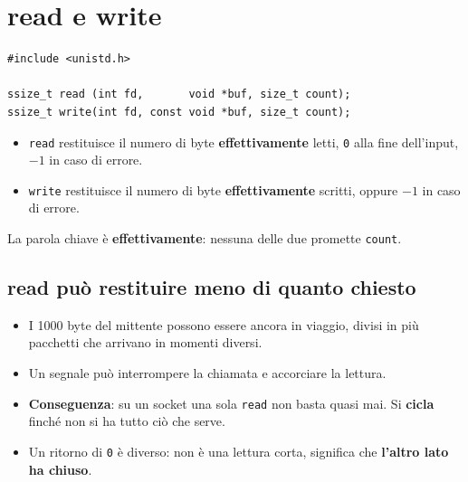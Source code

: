 \section{read e write}

\begin{lstlisting}[language={[POSIX]C}]
#include <unistd.h>

ssize_t read (int fd,       void *buf, size_t count);
ssize_t write(int fd, const void *buf, size_t count);
\end{lstlisting}

\begin{itemize}
    \item \texttt{read} restituisce il numero di byte \textbf{effettivamente} letti, \texttt{0} alla fine dell'input,
          $-1$ in caso di errore.
    \item \texttt{write} restituisce il numero di byte \textbf{effettivamente} scritti, oppure $-1$ in caso di errore.
\end{itemize}

La parola chiave è \textbf{effettivamente}: nessuna delle due promette \texttt{count}.

\subsection{read può restituire meno di quanto chiesto}


\begin{itemize}
    \item I 1000 byte del mittente possono essere ancora in viaggio, divisi in più pacchetti che arrivano in momenti
          diversi.
    \item Un segnale può interrompere la chiamata e accorciare la lettura.
    \item \textbf{Conseguenza}: su un socket una sola \texttt{read} non basta quasi mai. Si \textbf{cicla} finché non si
          ha tutto ciò che serve.
    \item Un ritorno di \texttt{0} è diverso: non è una lettura corta, significa che \textbf{l'altro lato ha chiuso}.
\end{itemize}

